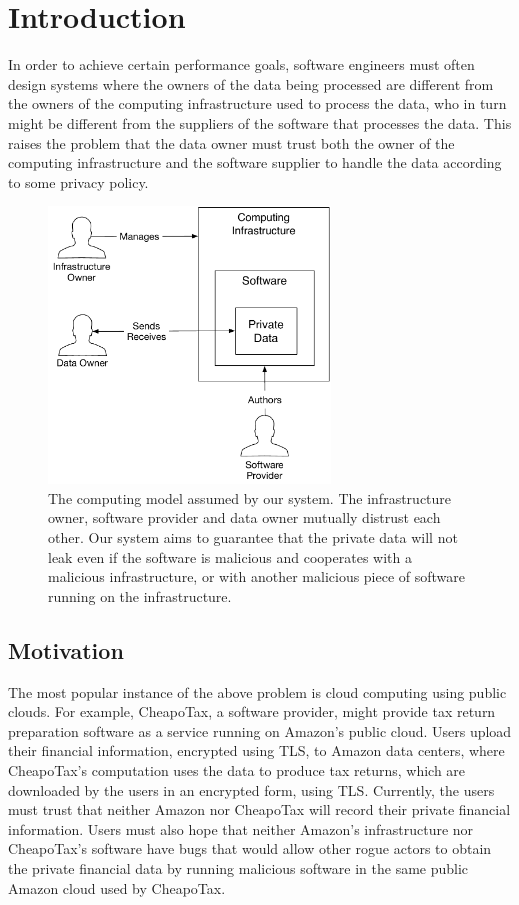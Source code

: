 \section{Introduction}
\label{sec:intro}

In order to achieve certain performance goals, software engineers must often
design systems where the owners of the data being processed are different from
the owners of the computing infrastructure used to process the data, who in
turn might be different from the suppliers of the software that processes the
data. This raises the problem that the data owner must trust both the owner
of the computing infrastructure and the software supplier to handle the data
according to some privacy policy.

\begin{figure}[hbtp]
  \centering
  \includegraphics[width=75mm]{figures/computing_model.pdf}
  \caption{
    The computing model assumed by our system. The infrastructure owner,
    software provider and data owner mutually distrust each other. Our system
    aims to guarantee that the private data will not leak even if the software
    is malicious and cooperates with a malicious infrastructure, or with
    another malicious piece of software running on the infrastructure.
  }
  \label{fig:computing_model}
\end{figure}

\subsection{Motivation}
\label{sec:motivation}

The most popular instance of the above problem is cloud computing using public
clouds. For example, CheapoTax, a software provider, might provide tax return
preparation software as a service running on Amazon's public cloud. Users
upload their financial information, encrypted using TLS, to Amazon data
centers, where CheapoTax's computation uses the data to produce tax returns,
which are downloaded by the users in an encrypted form, using TLS. Currently,
the users must trust that neither Amazon nor CheapoTax will record their
private financial information. Users must also hope that neither Amazon's
infrastructure nor CheapoTax's software have bugs that would allow other rogue
actors to obtain the private financial data by running malicious software in
the same public Amazon cloud used by CheapoTax.

